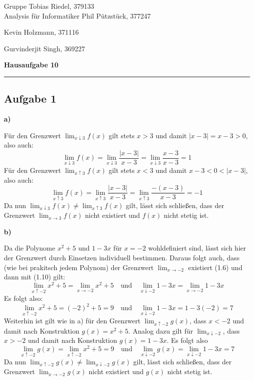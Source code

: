 \documentclass[a4paper,graphics,11pt]{article}
\newcommand{\aufgabe}[1]{\subsection*{Aufgabe #1}}
\begin{document}
\noindent Gruppe              \hfill Tobias Riedel, 379133 \\
\noindent Analysis für Informatiker             \hfill Phil Pützstück, 377247 \\
\strut\hfill Kevin Holzmann, 371116\\
\strut\hfill Gurvinderjit Singh, 369227
\begin{center}
	\LARGE{\textbf{Hausaufgabe 10}}
\end{center}
\begin{center}
\rule[0.1ex]{\textwidth}{1pt}
\end{center}



\aufgabe{1}
\textbf{a)}

Für den Grenzwert $\lim_{x \downarrow 3}\limits f(x)$ gilt stets $x > 3$ und damit
$|x-3| = x-3 > 0$, also auch:
$$
    \lim_{x \downarrow 3} f(x)
    = \lim_{x \downarrow 3} \frac{|x-3|}{x-3}
    = \lim_{x \downarrow 3} \frac{x-3}{x-3}
    = 1
$$
Für den Grenzwert $\lim_{x \uparrow 3}\limits f(x)$ gilt stets $x < 3$ und damit
$x-3 < 0 < |x-3|$, also auch:
$$
    \lim_{x \uparrow 3} f(x)
    = \lim_{x \uparrow 3} \frac{|x-3|}{x-3}
    = \lim_{x \uparrow 3} \frac{-(x-3)}{x-3}
    = -1
$$
Da nun $\lim_{x \downarrow 3}\limits f(x) \neq \lim_{x \uparrow 3}\limits f(x)$ gilt,
lässt sich schließen, dass der Grenzwert $\lim_{x \to 3}\limits f(x)$ nicht existiert und
$f(x)$ nicht stetig ist.

\textbf{b)}

Da die Polynome $x^2+5$ und $1-3x$ für $x = -2$ wohldefiniert sind, lässt sich hier der
Grenzwert durch Einsetzen individuell bestimmen. Daraus folgt auch, dass (wie bei prakitsch
jedem Polynom) der Grenzwert $\lim_{x \to -2}$ existiert (1.6) und dann mit (1.10) gilt:
$$ \lim_{x \uparrow -2} x^2+5 = \lim_{x \to -2} x^2+5
    \quad\text{und}\quad
    \lim_{x \downarrow -2} 1-3x = \lim_{x \to -2} 1-3x
$$
Es folgt also:
$$
    \lim_{x \uparrow -2} x^2+5 = (-2)^2+5 = 9
    \quad\text{und}\quad
    \lim_{x \downarrow -2} 1-3x = 1-3(-2) = 7
$$
Weiterhin ist gilt wie in a) für den Grenzwert $\lim_{x \uparrow -2}\limits g(x)$, dass $x<-2$
und damit nach Konstruktion $g(x) = x^2+5$. Analog dazu gilt für $\lim_{x \downarrow -2}$,
dass $x>-2$ und damit nach Konstruktion $g(x) = 1-3x$. Es folgt also
$$
    \lim_{x \uparrow -2} g(x) = \lim_{x \uparrow -2} x^2+5 = 9
    \quad\text{und}\quad
    \lim_{x \downarrow -2} g(x) = \lim_{x \downarrow -2} 1-3x = 7
$$
Da nun $\lim_{x \uparrow -2}\limits g(x) \neq \lim_{x \downarrow -2}\limits g(x)$ gilt,
lässt sich schließen, dass der Grenzwert $\lim_{x \to -2}\limits g(x)$ nicht existiert und
$g(x)$ nicht stetig ist.
\newpage
\end{document}
